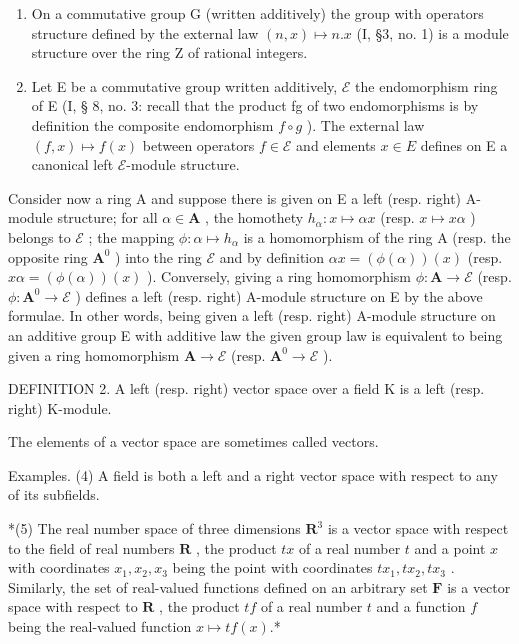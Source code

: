 \begin{enumerate}
\def\labelenumi{(\arabic{enumi})}
\setcounter{enumi}{1}
\item
  On a commutative group G (written additively) the group with operators structure defined by the external law \((n, x) \mapsto n.x\) (I, §3, no. 1) is a module structure over the ring Z of rational integers.
\item
  Let E be a commutative group written additively, \(\mathcal{E}\) the endomorphism ring of E (I, § 8, no. 3: recall that the product fg of two endomorphisms is by definition the composite endomorphism \(f \circ g\) ). The external law \((f, x) \mapsto f(x)\) between operators \(f \in \mathcal{E}\) and elements \(x \in E\) defines on E a canonical left \(\mathcal{E}\)-module structure.
\end{enumerate}

Consider now a ring A and suppose there is given on E a left (resp. right) A-module structure; for all \(\alpha \in \mathbf{A}\) , the homothety \(h_{\alpha}: x \mapsto \alpha x\) (resp. \(x \mapsto x\alpha\) ) belongs to \(\mathcal{E}\) ; the mapping \(\phi: \alpha \mapsto h_{\alpha}\) is a homomorphism of the ring A (resp. the opposite ring \(\mathbf{A}^0\) ) into the ring \(\mathcal{E}\) and by definition \(\alpha x = (\phi(\alpha))(x)\) (resp. \(x\alpha = (\phi(\alpha))(x)\) ). Conversely, giving a ring homomorphism \(\phi: \mathbf{A} \to \mathcal{E}\) (resp. \(\phi: \mathbf{A}^0 \to \mathcal{E}\) ) defines a left (resp. right) A-module structure on E by the above formulae. In other words, being given a left (resp. right) A-module structure on an additive group E with additive law the given group law is equivalent to being given a ring homomorphism \(\mathbf{A} \to \mathcal{E}\) (resp. \(\mathbf{A}^0 \to \mathcal{E}\) ).

DEFINITION 2. A left (resp. right) vector space over a field K is a left (resp. right) K-module.

The elements of a vector space are sometimes called vectors.

Examples. (4) A field is both a left and a right vector space with respect to any of its subfields.

*(5) The real number space of three dimensions \(\mathbf{R}^3\) is a vector space with respect to the field of real numbers \(\mathbf{R}\) , the product \(tx\) of a real number \(t\) and a point \(x\) with coordinates \(x_1, x_2, x_3\) being the point with coordinates \(tx_1, tx_2, tx_3\) . Similarly, the set of real-valued functions defined on an arbitrary set \(\mathbf{F}\) is a vector space with respect to \(\mathbf{R}\) , the product \(tf\) of a real number \(t\) and a function \(f\) being the real-valued function \(x \mapsto tf(x)\).*

